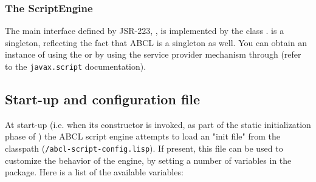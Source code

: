 \documentclass[10pt]{book}
\begin{document}
\subsubsection{The ScriptEngine}

The main interface defined by JSR-223, ,
is implemented by the class
. 
is a singleton, reflecting the fact that ABCL is a singleton as
well. You can obtain an instance of  using the
 or by using the service provider
mechanism through  (refer to the
\texttt{javax.script} documentation).

\subsection{Start-up and configuration file}

At start-up (i.e. when its constructor is invoked, as part of the
static initialization phase of ) the ABCL
script engine attempts to load an "init file" from the classpath
(\texttt{/abcl-script-config.lisp}). If present, this file can be used to
customize the behavior of the engine, by setting a number of
variables in the  package. Here is a list of the available
variables:
\end{document}
